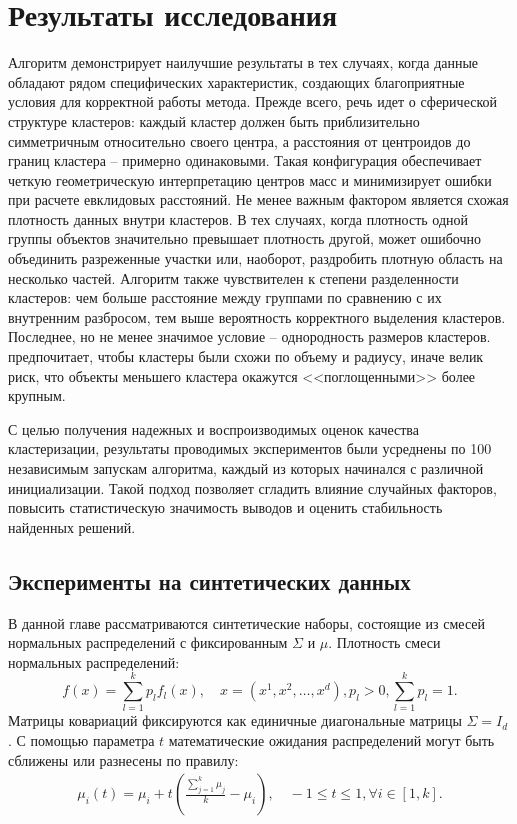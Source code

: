 \section{Результаты исследования}

    Алгоритм \kmeans{} демонстрирует наилучшие результаты в тех случаях, когда данные обладают рядом специфических характеристик, создающих благоприятные условия для корректной работы метода. Прежде всего, речь идет о сферической структуре кластеров: каждый кластер должен быть приблизительно симметричным относительно своего центра, а расстояния от центроидов до границ кластера -- примерно одинаковыми. Такая конфигурация обеспечивает четкую геометрическую интерпретацию центров масс и минимизирует ошибки при расчете евклидовых расстояний. Не менее важным фактором является схожая плотность данных внутри кластеров. В тех случаях, когда плотность одной группы объектов значительно превышает плотность другой, \kmeans{} может ошибочно объединить разреженные участки или, наоборот, раздробить плотную область на несколько частей. Алгоритм также чувствителен к степени разделенности кластеров: чем больше расстояние между группами по сравнению с их внутренним разбросом, тем выше вероятность корректного выделения кластеров. Последнее, но не менее значимое условие -- однородность размеров кластеров. \kmeans{} предпочитает, чтобы кластеры были схожи по объему и радиусу, иначе велик риск, что объекты меньшего кластера окажутся <<поглощенными>> более крупным.

    С целью получения надежных и воспроизводимых оценок качества кластеризации, результаты проводимых экспериментов были усреднены по 100 независимым запускам алгоритма, каждый из которых начинался с различной инициализации. Такой подход позволяет сгладить влияние случайных факторов, повысить статистическую значимость выводов и оценить стабильность найденных решений.

    \subsection{Эксперименты на синтетических данных}

        В данной главе рассматриваются синтетические наборы, состоящие из смесей нормальных распределений с фиксированным \(\Sigma\) и \(\mu\). Плотность смеси нормальных распределений:
        \begin{equation*}
            f(x) = \sum_{l=1}^k p_lf_l(x), \quad x=(x^1,x^2, \dots,x^d),  p_l>0, \sum_{l=1}^{k}p_l=1.
        \end{equation*}
        Матрицы ковариаций фиксируются как единичные диагональные матрицы \(\Sigma = I_d\). С помощью параметра \(t\) математические ожидания распределений могут быть сближены или разнесены по правилу:
        \begin{gather*}
            \mu_i(t) = \mu_i + t( \frac{\sum_{j=1}^{k}\mu_j}{k} - \mu_i), \quad -1 \leq t \leq 1, \forall i \in [1, k].
        \end{gather*}

